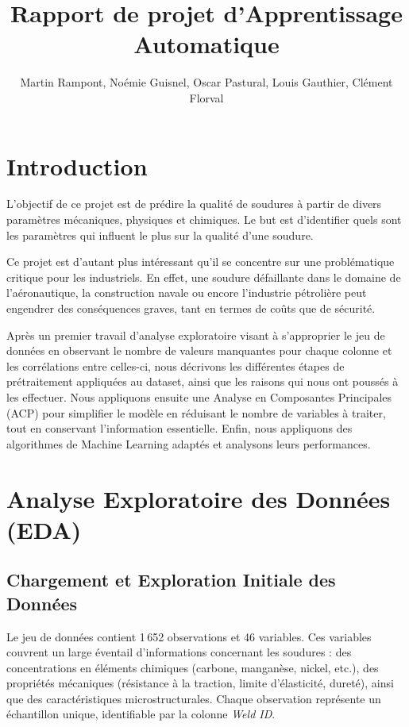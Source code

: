 \documentclass{article}
\title{Rapport de projet d'Apprentissage Automatique}
\author{Martin Rampont, Noémie Guisnel, Oscar Pastural, Louis Gauthier, Clément Florval}
\begin{document}
\maketitle

\section{Introduction}

L'objectif de ce projet est de prédire la qualité de soudures à partir de divers paramètres mécaniques, physiques et chimiques. Le but est d'identifier quels sont les paramètres qui influent le plus sur la qualité d'une soudure.

Ce projet est d'autant plus intéressant qu'il se concentre sur une problématique critique pour les industriels. En effet, une soudure défaillante dans le domaine de l'aéronautique, la construction navale ou encore l'industrie pétrolière peut engendrer des conséquences graves, tant en termes de coûts que de sécurité.

Après un premier travail d'analyse exploratoire visant à s'approprier le jeu de données en observant le nombre de valeurs manquantes pour chaque colonne et les corrélations entre celles-ci, nous décrivons les différentes étapes de prétraitement appliquées au dataset, ainsi que les raisons qui nous ont poussés à les effectuer. Nous appliquons ensuite une Analyse en Composantes Principales (ACP) pour simplifier le modèle en réduisant le nombre de variables à traiter, tout en conservant l'information essentielle. Enfin, nous appliquons des algorithmes de Machine Learning adaptés et analysons leurs performances.

\section{Analyse Exploratoire des Données (EDA)}

\subsection{Chargement et Exploration Initiale des Données}

Le jeu de données contient 1\,652 observations et 46 variables. Ces variables couvrent un large éventail d'informations concernant les soudures : des concentrations en éléments chimiques (carbone, manganèse, nickel, etc.), des propriétés mécaniques (résistance à la traction, limite d’élasticité, dureté), ainsi que des caractéristiques microstructurales. Chaque observation représente un échantillon unique, identifiable par la colonne \textit{Weld ID}.
\end{document}
